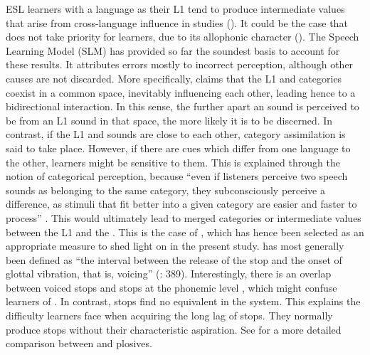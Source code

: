 \documentclass[output=paper]{langsci/langscibook}
\begin{document}
  ESL learners with a  language as their L1 tend to produce intermediate  values that arise from cross-language influence in  studies (\citealt{Flege1987,FlegeEtAl1998,ReisNobre-Oliveira2007,YavaşWildermuth2006,Mora2008,SchwartzhauptEtAl2014,AlvesZimmer2015}). It could be the case that  does not take priority for learners, due to its allophonic character (\citealt{AlvesZimmer2015}). The Speech Learning Model (SLM) has provided so far the soundest basis to account for these results. It attributes   errors mostly to incorrect perception, although other causes are not discarded. More specifically, \citet{Flege1995} claims that the L1 and  categories coexist in a common  space, inevitably influencing each other, leading hence to a bidirectional  interaction. In this sense, the further apart an  sound is perceived to be from an L1 sound in that  space, the more likely it is to be discerned. In contrast, if the L1 and  sounds are close to each other, category assimilation is said to take place. However, if there are cues which differ from one language to the other, learners might be sensitive to them. This is explained through the notion of categorical perception, because “even if listeners perceive two speech sounds as belonging to the same category, they subconsciously perceive a difference, as stimuli that fit better into a given category are easier and faster to process” \citep[25]{Bach2012}. This would ultimately lead to merged categories or intermediate values between the L1 and the . This is the case of , which has hence been selected as an appropriate measure to shed light on   in the present study.  has most generally been defined as “the interval between the release of the stop and the onset of glottal vibration, that is, voicing” (\citealt{AbramsonLisker1964}: 389). Interestingly, there is an overlap between  voiced stops and   stops at the phonemic level \cite{Yavaş2007}, which might confuse  learners of . In contrast,   stops find no equivalent in the  system. This explains the difficulty  learners face when acquiring the long lag of   stops. They normally produce   stops without their characteristic aspiration. See \citet{Yavaş2007} for a more detailed comparison between  and  plosives.
\end{document}
